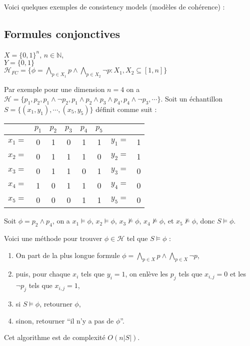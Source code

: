 \documentclass{article}
\theoremstyle{plain}
\theoremstyle{remark}
\theoremstyle{definition}
\begin{document}
Voici quelques exemples de consistency models (modèles de cohérence) :


\subsection{Formules conjonctives}

$X=\{0,1\}^n$, $n\in \mathbb{N}$,\\
$Y=\{0,1\}$\\
$\mathcal{H}_{FC}=\{\phi = \bigwedge_{p\in X_1} p \land \bigwedge_{p\in X_2} \neg p : X_1, X_2 \subseteq [1,n]\}$

Par exemple pour une dimension $n=4$ on a $\mathcal{H}=\{p_1, p_2, p_1\land \neg p_2, p_1\land p_2\land p_3\land p_4, p_4\land\neg p_3, \cdots \}$. Soit un échantillon $S=\{(x_1,y_1),\cdots,(x_5,y_5)\}$ définit comme suit :

\begin{center}
\begin{tabular}{ | c | c | c | c | c | c || c | c |  } 
    \hline
    & $p_1$ & $p_2$ & $p_3$ & $p_4$ & $p_5$ && \\
    \hline
    $x_1=$ & 0 & 1 & 0 & 1 & 1 & $y_1=$ & 1\\
    \hline
    $x_2=$ & 0 & 1 & 1 & 1 & 0 & $y_2=$ & 1\\
    \hline
    $x_3=$ & 0 & 1 & 1 & 0 & 1 & $y_3=$ & 0\\
    \hline
    $x_4=$ & 1 & 0 & 1 & 1 & 0 & $y_4=$ & 0\\
    \hline
    $x_5=$ & 0 & 0 & 0 & 1 & 1 & $y_5=$ & 0\\
    \hline
\end{tabular}
\end{center}

Soit $\phi=p_2\land p_4$, on a $x_1\models\phi$, $x_2\models\phi$, $x_3\not\models\phi$, $x_4\not\models\phi$, et $x_5\not\models\phi$, donc $S\models \phi$.

Voici une méthode pour trouver $\phi\in\mathcal{H}$ tel que $S\models \phi$ :

\begin{enumerate}
    \item On part de la plus longue formule $\phi = \bigwedge_{p\in X} p \land \bigwedge_{p\in X} \neg p$,
    \item puis, pour chaque $x_i$ tels que $y_i=1$, on enlève les $p_j$ tels que $x_{i,j}=0$ et les $\neg p_j$ tels que $x_{i,j}=1$,
    \item si $S\models \phi$, retourner $\phi$,
    \item sinon, retourner ``il n'y a pas de $\phi$''.
\end{enumerate}
Cet algorithme est de complexité $O(n|S|)$.
\end{document}
